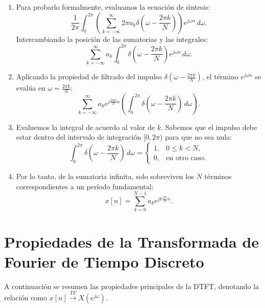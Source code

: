 \begin{enumerate}
	\item Para probarlo formalmente, evaluamos la ecuación de s\'{\i}ntesis:
	\begin{equation}
		\frac{1}{2\pi} \int_{0}^{2\pi} \left( \sum_{k=-\infty}^{\infty} 2\pi a_{k} \delta\left(\omega - \frac{2\pi k}{N}\right) \right) e^{j\omega n} \, d\omega.
	\end{equation}
	Intercambiando la posici\'{o}n de las sumatorias y las integrales:
	\begin{equation}
		\sum_{k=-\infty}^{\infty} a_{k} \int_{0}^{2\pi} \delta\left(\omega - \frac{2\pi k}{N}\right) e^{j\omega n} \, d\omega.
	\end{equation}
	
	\item Aplicando la propiedad de filtrado del impulso $\delta\left(\omega - \frac{2\pi k}{N}\right)$, el término $e^{j\omega n}$ se evalúa en $\omega = \frac{2\pi k}{N}$:
	\begin{equation}
		\sum_{k=-\infty}^{\infty} a_{k} e^{j\frac{2\pi k}{N}n} \left( \int_{0}^{2\pi} \delta\left(\omega - \frac{2\pi k}{N}\right) \, d\omega \right).
	\end{equation}
	
	\item Evaluemos la integral de acuerdo al valor de $k$. Sabemos que el impulso debe estar dentro del intervalo de integración $[0, 2\pi)$ para que no sea nula:
	\begin{equation}
		\int_{0}^{2\pi} \delta\left(\omega - \frac{2\pi k}{N}\right) \, d\omega = 
		\begin{cases}
			1, & 0 \leq k < N, \\ 
			0, & \text{en otro caso}.
		\end{cases}
	\end{equation}
	
	\item Por lo tanto, de la sumatoria infinita, solo sobreviven los $N$ términos correspondientes a un período fundamental:
	\begin{equation}
		x[n] = \sum_{k=0}^{N-1} a_{k} e^{jk\frac{2\pi}{N}n}.
	\end{equation}
\end{enumerate}

\section{Propiedades de la Transformada de Fourier de Tiempo Discreto}

A continuación se resumen las propiedades principales de la DTFT, denotando la relación como $x[n] \xrightarrow{TF} X(e^{j\omega})$.

